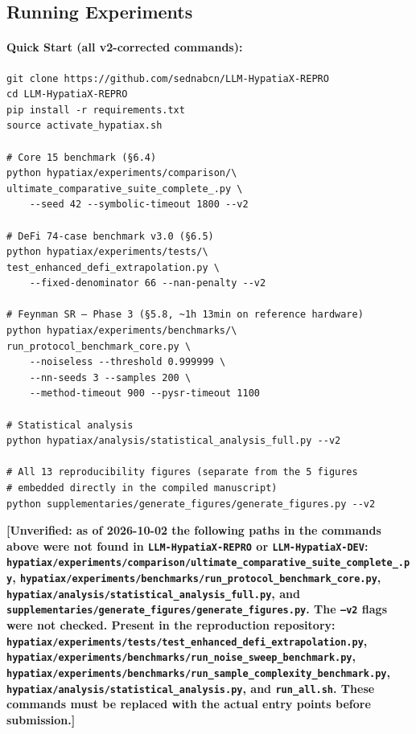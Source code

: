 \documentclass[twoside,11pt]{article}
\begin{document}
\subsection{Running Experiments}

\paragraph{Quick Start (all v2-corrected commands):}
\begin{small}
\begin{verbatim}
git clone https://github.com/sednabcn/LLM-HypatiaX-REPRO
cd LLM-HypatiaX-REPRO
pip install -r requirements.txt
source activate_hypatiax.sh

# Core 15 benchmark (§6.4)
python hypatiax/experiments/comparison/\
ultimate_comparative_suite_complete_.py \
    --seed 42 --symbolic-timeout 1800 --v2

# DeFi 74-case benchmark v3.0 (§6.5)
python hypatiax/experiments/tests/\
test_enhanced_defi_extrapolation.py \
    --fixed-denominator 66 --nan-penalty --v2

# Feynman SR — Phase 3 (§5.8, ~1h 13min on reference hardware)
python hypatiax/experiments/benchmarks/\
run_protocol_benchmark_core.py \
    --noiseless --threshold 0.999999 \
    --nn-seeds 3 --samples 200 \
    --method-timeout 900 --pysr-timeout 1100

# Statistical analysis
python hypatiax/analysis/statistical_analysis_full.py --v2

# All 13 reproducibility figures (separate from the 5 figures
# embedded directly in the compiled manuscript)
python supplementaries/generate_figures/generate_figures.py --v2
\end{verbatim}
\end{small}

\textbf{[Unverified: as of 2026-10-02 the following paths in the commands above
were not found in \texttt{LLM-HypatiaX-REPRO} or \texttt{LLM-HypatiaX-DEV}:
\texttt{hypatiax/experiments/comparison/ultimate\_comparative\_suite\_complete\_.py},
\texttt{hypatiax/experiments/benchmarks/run\_protocol\_benchmark\_core.py},
\texttt{hypatiax/analysis/statistical\_analysis\_full.py}, and
\texttt{supplementaries/generate\_figures/generate\_figures.py}. The
\texttt{--v2} flags were not checked. Present in the reproduction repository:
\texttt{hypatiax/experiments/tests/test\_enhanced\_defi\_extrapolation.py},
\texttt{hypatiax/experiments/benchmarks/run\_noise\_sweep\_benchmark.py},
\texttt{hypatiax/experiments/benchmarks/run\_sample\_complexity\_benchmark.py},
\texttt{hypatiax/analysis/statistical\_analysis.py}, and \texttt{run\_all.sh}.
These commands must be replaced with the actual entry points before submission.]}
\end{document}
